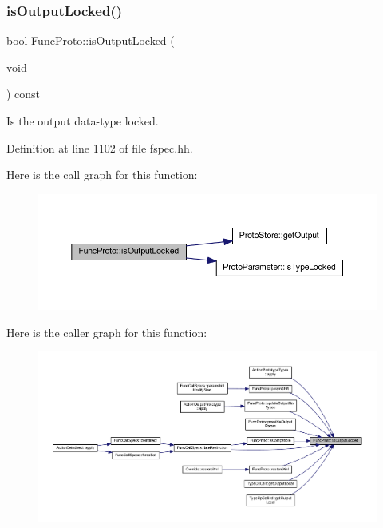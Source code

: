 \subsubsection{\texorpdfstring{isOutputLocked()}{isOutputLocked()}}
{\footnotesize\ttfamily bool Func\+Proto\+::is\+Output\+Locked (\begin{DoxyParamCaption}\item[{void}]{ }\end{DoxyParamCaption}) const\hspace{0.3cm}{\ttfamily [inline]}}



Is the output data-\/type locked. 



Definition at line 1102 of file fspec.\+hh.

Here is the call graph for this function\+:
\nopagebreak
\begin{figure}[H]
\begin{center}
\leavevmode
\includegraphics[width=350pt]{class_func_proto_aa8e57d21d21d08253f67cb201e83c5e4_cgraph}
\end{center}
\end{figure}
Here is the caller graph for this function\+:
\nopagebreak
\begin{figure}[H]
\begin{center}
\leavevmode
\includegraphics[width=350pt]{class_func_proto_aa8e57d21d21d08253f67cb201e83c5e4_icgraph}
\end{center}
\end{figure}
\mbox{\label{class_func_proto_a7b7a58bea827081d275ae6112df7dce5}} 
